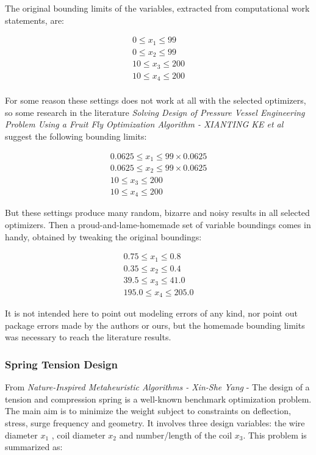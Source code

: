\documentclass[conference]{IEEEtran}
\begin{document}
The original bounding limits of the variables, extracted from computational work
statements, are:

\begin{equation}
    \begin{split}
        0 \leq x_1 \leq 99\\
        0 \leq x_2 \leq 99\\
        10 \leq x_3 \leq 200\\
        10 \leq x_4 \leq 200\\
    \end{split}
\end{equation}

For some reason these settings does not work at all with the selected optimizers, so
some research in the literature \textit{Solving Design of Pressure Vessel Engineering
Problem Using a Fruit Fly Optimization Algorithm - XIANTING KE et al} suggest the
following bounding limits:

\begin{equation}
    \begin{split}
        0.0625 \leq x_1 \leq 99 \times 0.0625\\
        0.0625 \leq x_2 \leq 99 \times 0.0625\\
        10 \leq x_3 \leq 200\\
        10 \leq x_4 \leq 200
    \end{split}
\end{equation}

But these settings produce many random, bizarre and noisy results in all selected optimizers. Then
a proud-and-lame-homemade set of variable boundings comes in handy, obtained by tweaking the original
boundings:

\begin{equation}
    \begin{split}
        0.75 \leq x_1 \leq 0.8\\
        0.35 \leq x_2 \leq 0.4\\
        39.5 \leq x_3 \leq 41.0\\
        195.0 \leq x_4 \leq 205.0
    \end{split}
\end{equation}

It is not intended here to point out modeling errors of any kind, nor point out package
errors made by the authors or ours, but the homemade bounding limits was necessary to
reach the literature results.


\subsubsection{Spring Tension Design}
\label{subsubsec:methodology-spring-tension-design}
From \textit{Nature-Inspired Metaheuristic Algorithms - Xin-She Yang} -
The design of a tension and compression spring is a well-known benchmark
optimization problem.
The main aim is to minimize the weight subject
to constraints on deflection, stress, surge frequency and geometry. It involves
three design variables: the wire diameter $x_1$ , coil diameter $x_2$ and
number/length of the coil $x_3$.
This problem is summarized as:
\end{document}
